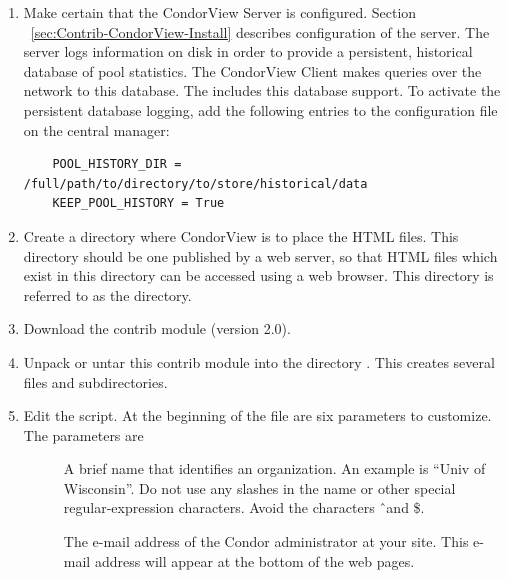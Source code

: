 \begin{enumerate}

\item Make certain that the CondorView Server is configured.
Section ~\ref{sec:Contrib-CondorView-Install}
describes configuration of the server.
The server logs information on disk in order to provide a persistent,
historical database of pool statistics.
The CondorView Client makes queries over the network to this
database.
The  includes this database support.
To activate the persistent database logging, add the following entries to
the configuration file on the central manager: 
\begin{verbatim}
    POOL_HISTORY_DIR = /full/path/to/directory/to/store/historical/data 
    KEEP_POOL_HISTORY = True 
\end{verbatim}

\item Create a directory where CondorView is to place the HTML files.  
This directory should be one published by a web server, so that HTML
files which exist in this directory can be accessed using a web browser.  
This directory is referred to as the  directory.

\item Download the  contrib module (version 2.0).

\item Unpack or untar this contrib module into the
directory .
This creates several files and subdirectories.

\item Edit the  script.  At the beginning of the file
are six parameters to customize.
The parameters are

        \begin{description}

	\item[] A brief name that identifies an
	organization. An example is ``Univ of Wisconsin''.  Do not
	use any slashes in the name or other special regular-expression
	characters. Avoid the characters \Bs \^\  and \$.

	\item[] The e-mail
	address of the Condor administrator at your site.  
	This e-mail address will appear at the bottom of the web pages.


\end{description}
\end{enumerate}

